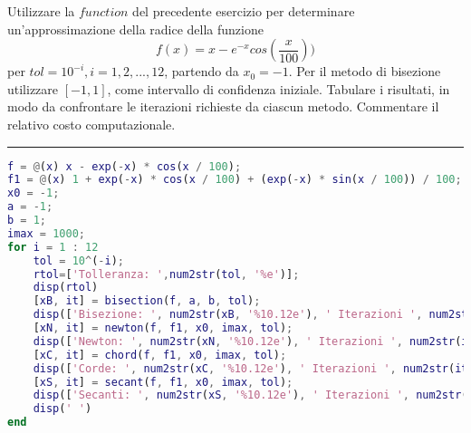 Utilizzare la $function$ del precedente esercizio per determinare un'approssimazione della
radice della funzione
$$f(x)=x-e^{-x}cos(\frac{x}{100}))$$
per $tol=10^{-i}, i=1,2,...,12$, partendo da $x_\mathrm{0}=-1$. Per il metodo di bisezione utilizzare 
$[-1,1]$, come intervallo di confidenza iniziale. Tabulare i risultati, in modo da confrontare le iterazioni
richieste da ciascun metodo. Commentare il relativo costo computazionale.

\hspace*{\fill}
\par\noindent\rule{\textwidth}{0.4pt}
\hspace*{\fill}

\begin{lstlisting}[language=Matlab, caption=Codice Matlab]
f = @(x) x - exp(-x) * cos(x / 100);
f1 = @(x) 1 + exp(-x) * cos(x / 100) + (exp(-x) * sin(x / 100)) / 100;
x0 = -1;
a = -1;
b = 1;
imax = 1000;
for i = 1 : 12
	tol = 10^(-i);
	rtol=['Tolleranza: ',num2str(tol, '%e')];
	disp(rtol)
	[xB, it] = bisection(f, a, b, tol);
	disp(['Bisezione: ', num2str(xB, '%10.12e'), ' Iterazioni ', num2str(it)])
	[xN, it] = newton(f, f1, x0, imax, tol);
	disp(['Newton: ', num2str(xN, '%10.12e'), ' Iterazioni ', num2str(it)])
	[xC, it] = chord(f, f1, x0, imax, tol);
	disp(['Corde: ', num2str(xC, '%10.12e'), ' Iterazioni ', num2str(it)])
	[xS, it] = secant(f, f1, x0, imax, tol);
	disp(['Secanti: ', num2str(xS, '%10.12e'), ' Iterazioni ', num2str(it)])
	disp(' ')
end
\end{lstlisting}

